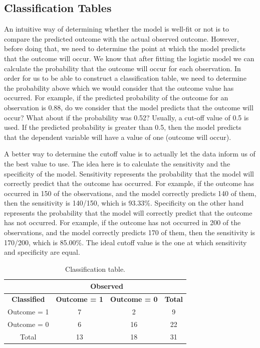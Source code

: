 \documentclass[a4paper,12pt,oneside]{book}
\begin{document}
\subsection{Classification Tables}
An intuitive way of determining whether the model is well-fit or not is to compare the predicted outcome with the actual observed outcome. However, before doing that, we need to determine the point at which the model 
predicts that the outcome will occur. We know that after fitting the logistic model we can calculate the probability that the outcome will occur for each observation. In order for us to be able to construct a classification 
table, we need to determine the probability above which we would consider that the outcome value has occurred. For example, if the predicted probability of the outcome for an observation is 0.88, do we consider that the 
model predicts that the outcome will occur? What about if the probability was 0.52? Usually, a cut-off value of 0.5 is used. If the predicted probability is greater than 0.5, then the model predicts that the dependent 
variable will have a value of one (outcome will occur).

A better way to determine the cutoff value is to actually let the data inform us of the best value to use. The idea here is to calculate the sensitivity and the specificity of the model. Sensitivity represents the 
probability that the model will correctly predict that the outcome has occurred. For example, if the outcome has occurred in 150 of the observations, and the model correctly predicts 140 of them, then the sensitivity 
is 140/150, which is 93.33\%. Specificity on the other hand represents the probability that the model will correctly predict that the outcome has not occurred. For example, if the outcome has not occurred in 200 of the 
observations, and the model correctly predicts 170 of them, then the sensitivity is 170/200, which is 85.00\%. The ideal cutoff value is the one at which sensitivity and specificity are equal.
\begin{table}[h!t]
	\caption{Classification table.} \label{table:classification}
	\centering
	\begin{tabular}{c |c c| c}
	\hline
	{} & \multicolumn{2}{|c|}{Observed} & {} \\
	\hline
	\bf Classified & \bf Outcome = 1 & \bf Outcome = 0 & \bf Total \\
	Outcome = 1 & 7 & 2 & 9 \\
	Outcome = 0 & 6 & 16 & 22 \\
	Total & 13 & 18 & 31 \\
	\hline
	\end{tabular}
\end{table}
\end{document}

